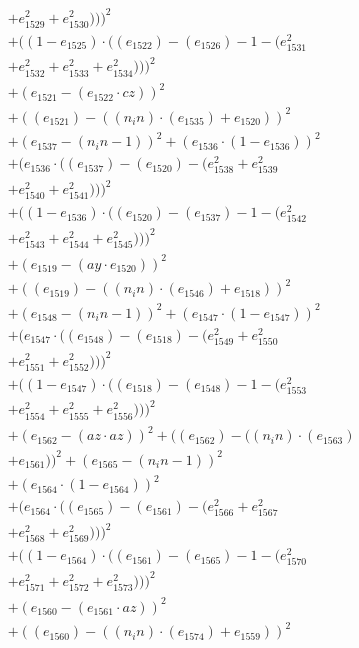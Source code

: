 \documentclass[10pt, a4paper]{article}
\begin{document}
\begin{small}
\begin{align*}
& + e_{1529}^{2} + e_{1530}^{2})))^{2} \\
& + ((1 - e_{1525})  \cdot  ((e_{1522}) - (e_{1526}) - 1 - (e_{1531}^{2} \\
& + e_{1532}^{2} + e_{1533}^{2} + e_{1534}^{2})))^{2} \\
& + (e_{1521} - (e_{1522}  \cdot  cz))^{2} \\
& + ((e_{1521}) - ((n_in)  \cdot  (e_{1535}) + e_{1520}))^{2} \\
& + (e_{1537} - (n_in - 1))^{2} + (e_{1536}  \cdot  (1 - e_{1536}))^{2} \\
& + (e_{1536}  \cdot  ((e_{1537}) - (e_{1520}) - (e_{1538}^{2} + e_{1539}^{2} \\
& + e_{1540}^{2} + e_{1541}^{2})))^{2} \\
& + ((1 - e_{1536})  \cdot  ((e_{1520}) - (e_{1537}) - 1 - (e_{1542}^{2} \\
& + e_{1543}^{2} + e_{1544}^{2} + e_{1545}^{2})))^{2} \\
& + (e_{1519} - (ay  \cdot  e_{1520}))^{2} \\
& + ((e_{1519}) - ((n_in)  \cdot  (e_{1546}) + e_{1518}))^{2} \\
& + (e_{1548} - (n_in - 1))^{2} + (e_{1547}  \cdot  (1 - e_{1547}))^{2} \\
& + (e_{1547}  \cdot  ((e_{1548}) - (e_{1518}) - (e_{1549}^{2} + e_{1550}^{2} \\
& + e_{1551}^{2} + e_{1552}^{2})))^{2} \\
& + ((1 - e_{1547})  \cdot  ((e_{1518}) - (e_{1548}) - 1 - (e_{1553}^{2} \\
& + e_{1554}^{2} + e_{1555}^{2} + e_{1556}^{2})))^{2} \\
& + (e_{1562} - (az  \cdot  az))^{2} + ((e_{1562}) - ((n_in)  \cdot  (e_{1563}) \\
& + e_{1561}))^{2} + (e_{1565} - (n_in - 1))^{2} \\
& + (e_{1564}  \cdot  (1 - e_{1564}))^{2} \\
& + (e_{1564}  \cdot  ((e_{1565}) - (e_{1561}) - (e_{1566}^{2} + e_{1567}^{2} \\
& + e_{1568}^{2} + e_{1569}^{2})))^{2} \\
& + ((1 - e_{1564})  \cdot  ((e_{1561}) - (e_{1565}) - 1 - (e_{1570}^{2} \\
& + e_{1571}^{2} + e_{1572}^{2} + e_{1573}^{2})))^{2} \\
& + (e_{1560} - (e_{1561}  \cdot  az))^{2} \\
& + ((e_{1560}) - ((n_in)  \cdot  (e_{1574}) + e_{1559}))^{2} \\

\end{align*}
\end{small}
\end{document}

